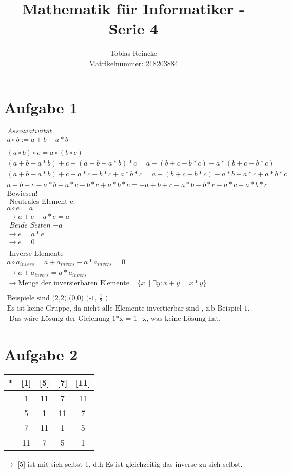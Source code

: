 \documentclass[]{article}
\title{Mathematik für Informatiker - Serie 4 }
\author{Tobias Reincke \\ Matrikelnummer: 218203884}
\begin{document}
\maketitle
\section{Aufgabe 1}
\begin{gather*}
\textit{Assoziativität} \\
a \circ b := a +b -a*b \\ \\
(a \circ b) \circ c = a \circ ( b \circ c ) \\
( a+b - a*b ) + c  - ( a+b - a*b )*c = a + (b + c -b*c  )  -  a* (b + c -b*c  )\\
( a+b - a*b ) + c -  a *c - b*c + a*b*c =  a + (b + c -b*c  )  - a*b -a*c + a*b*c\\
a + b + c - a*b -  a *c - b*c + a*b*c  = -  a +b+c -a*b-b*c -a*c + a*b*c\\
\text{Bewiesen!}\\
\text { Neutrales Element e: }\\
a \circ e = a \\
\rightarrow a + e -a*e = a  \\ 
\textit{ Beide Seiten   $-a $}\\
\rightarrow e = a* e \\
\rightarrow e = 0\\ \\
\text{ Inverse Elemente }\\
a \circ a_{invers} = a + a_{invers} - a *a_ {invers} = 0 \\
\rightarrow a  + a_{invers} = a*a_{invers}\\
\rightarrow \text{Menge der inversierbaren Elemente =} \{ x \| \exists y : x + y =x*y \}\\
\\
\text{Beispiele sind (2,2),(0,0) (-1, $\frac{1}{2}$ ) }\\
 \text{Es ist keine Gruppe, da nicht alle Elemente invertierbar sind , z.b Beispiel 1.}\\
  \text{  Das wäre Lösung der Gleichung 1*x = 1+x, was keine Lösung hat. }
\end{gather*}
\section{Aufgabe 2}
\begin{tabular}{|c|c|c|c|c|}
	\hline 
	*  & [1] & [5] & [7] & [11] \\ 
	\hline 
	[1] & 1 & 11 & 7 & 11 \\ 
	\hline 
	[5] & 5 & 1 & 11 & 7 \\ 
	\hline 
	[7]& 7 & 11 & 1 & 5 \\ 
	\hline 
	[11] & 11 & 7 & 5 & 1  \\ 
	\hline 
\end{tabular} 
$\rightarrow$ [5] ist mit sich selbst 1, d.h Es ist gleichzeitig das inverse zu sich selbst.
\end{document}
